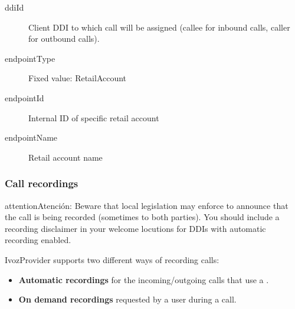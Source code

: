 \documentclass[letterpaper,10pt,spanish]{sphinxmanual}
\begin{document}
\begin{description}
\item[{ddiId}] \leavevmode{}\label{administration_portal/client/retail/calls/call_csv_schedulers:term-ddiid}
Client DDI to which call will be assigned (callee for inbound calls, caller for outbound calls).

\item[{endpointType}] \leavevmode{}\label{administration_portal/client/retail/calls/call_csv_schedulers:term-endpointtype}
Fixed value: RetailAccount

\item[{endpointId}] \leavevmode{}\label{administration_portal/client/retail/calls/call_csv_schedulers:term-endpointid}
Internal ID of specific retail account

\item[{endpointName}] \leavevmode{}\label{administration_portal/client/retail/calls/call_csv_schedulers:term-endpointname}
Retail account name

\end{description}


\subsubsection{Call recordings}
\label{administration_portal/client/retail/calls/call_recordings::doc}\label{administration_portal/client/retail/calls/call_recordings:call-recordings}\label{administration_portal/client/retail/calls/call_recordings:id1}
\begin{notice}{attention}{Atención:}
Beware that local legislation may enforce to announce that the
call is being recorded (sometimes to both parties). You should include
a recording disclaimer in your welcome locutions for DDIs with automatic
recording enabled.
\end{notice}

IvozProvider supports two different ways of recording calls:
\begin{itemize}
\item {} 
\textbf{Automatic recordings} for the incoming/outgoing calls that use a
{\hyperref[administration_portal/client/vpbx/ddis:ddis]{}}.

\item {} 
\textbf{On demand recordings} requested by a user during a call.

\end{itemize}
\end{document}
